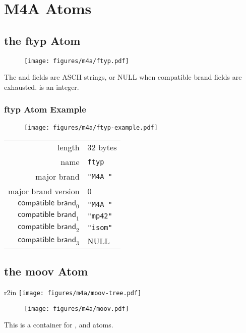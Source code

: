 \section{M4A Atoms}
\subsection{the ftyp Atom}
\begin{figure}[h]
  \texttt{[image: figures/m4a/ftyp.pdf]}
\end{figure}
\par
\noindent
The  and  fields are ASCII strings,
or NULL when compatible brand fields are exhausted.
 is an integer.

\subsubsection{ftyp Atom Example}
\begin{figure}[h]
  \texttt{[image: figures/m4a/ftyp-example.pdf]}
\end{figure}
\par
\noindent
\begin{tabular}{rl}
  \textsf{length} & 32 bytes \\
  \textsf{name} & \texttt{ftyp} \\
  \textsf{major brand} & \texttt{"M4A "} \\
  \textsf{major brand version} & 0 \\
  $\textsf{compatible brand}_0$ & \texttt{"M4A "} \\
  $\textsf{compatible brand}_1$ & \texttt{"mp42"} \\
  $\textsf{compatible brand}_2$ & \texttt{"isom"} \\
  $\textsf{compatible brand}_3$ & NULL \\
\end{tabular}

\clearpage

\subsection{the moov Atom}
\begin{wrapfigure}[5]{r}{2in}
  \texttt{[image: figures/m4a/moov-tree.pdf]}
\end{wrapfigure}

\begin{figure}[h]
  \texttt{[image: figures/m4a/moov.pdf]}
\end{figure}
\par
\noindent
This is a container for \hyperref[atom:mvhd]{},
\hyperref[atom:trak]{} and
\hyperref[atom:udta]{} atoms.

